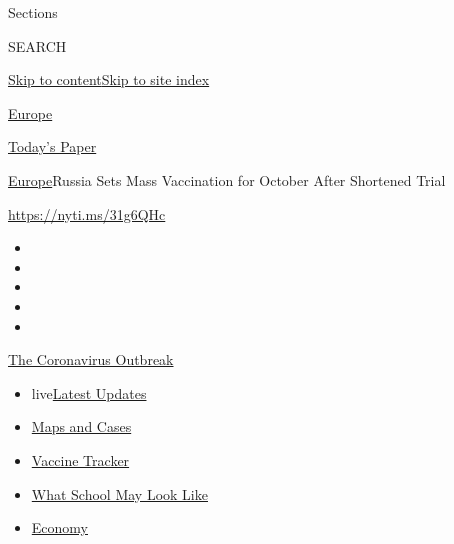 Sections

SEARCH

\protect\hyperlink{site-content}{Skip to
content}\protect\hyperlink{site-index}{Skip to site index}

\href{https://www.nytimes.com/section/world/europe}{Europe}

\href{https://myaccount.nytimes.com/auth/login?response_type=cookie\&client_id=vi}{}

\href{https://www.nytimes.com/section/todayspaper}{Today's Paper}

\href{/section/world/europe}{Europe}\textbar{}Russia Sets Mass
Vaccination for October After Shortened Trial

\url{https://nyti.ms/31g6QHc}

\begin{itemize}
\item
\item
\item
\item
\item
\end{itemize}

\href{https://www.nytimes.com/news-event/coronavirus?action=click\&pgtype=Article\&state=default\&region=TOP_BANNER\&context=storylines_menu}{The
Coronavirus Outbreak}

\begin{itemize}
\tightlist
\item
  live\href{https://www.nytimes.com/2020/08/02/world/coronavirus-updates.html?action=click\&pgtype=Article\&state=default\&region=TOP_BANNER\&context=storylines_menu}{Latest
  Updates}
\item
  \href{https://www.nytimes.com/interactive/2020/us/coronavirus-us-cases.html?action=click\&pgtype=Article\&state=default\&region=TOP_BANNER\&context=storylines_menu}{Maps
  and Cases}
\item
  \href{https://www.nytimes.com/interactive/2020/science/coronavirus-vaccine-tracker.html?action=click\&pgtype=Article\&state=default\&region=TOP_BANNER\&context=storylines_menu}{Vaccine
  Tracker}
\item
  \href{https://www.nytimes.com/interactive/2020/07/29/us/schools-reopening-coronavirus.html?action=click\&pgtype=Article\&state=default\&region=TOP_BANNER\&context=storylines_menu}{What
  School May Look Like}
\item
  \href{https://www.nytimes.com/live/2020/07/31/business/stock-market-today-coronavirus?action=click\&pgtype=Article\&state=default\&region=TOP_BANNER\&context=storylines_menu}{Economy}
\end{itemize}

